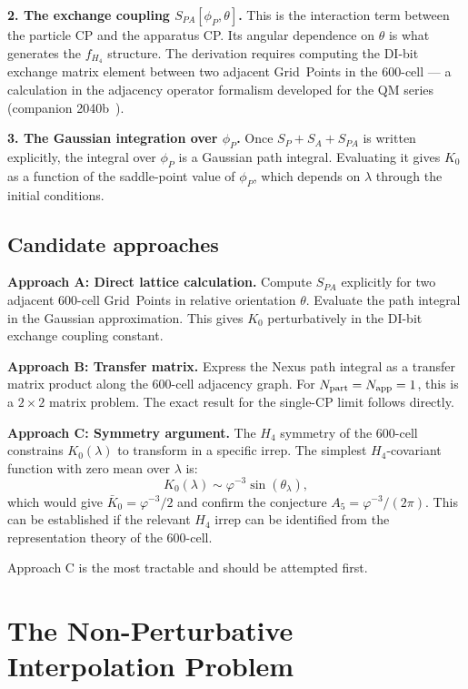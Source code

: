 \documentclass[11pt,letterpaper]{article}
\newcommand{\phig}{\varphi}
\begin{document}
\textbf{2. The exchange coupling $S_{PA}[\phi_P, \theta]$.}
This is the interaction term between the particle CP and the
apparatus CP.  Its angular dependence on $\theta$ is what
generates the $f_{H_4}$ structure.  The derivation requires
computing the DI-bit exchange matrix element between two
adjacent Grid~Points in the 600-cell --- a calculation in
the adjacency operator formalism developed for the QM series
(companion 2040b~\citep{cpp2040b}).

\textbf{3. The Gaussian integration over $\phi_P$.}
Once $S_P + S_A + S_{PA}$ is written explicitly, the integral
over $\phi_P$ is a Gaussian path integral.  Evaluating it
gives $K_0$ as a function of the saddle-point value of
$\phi_P$, which depends on $\lambda$ through the initial
conditions.

\subsection{Candidate approaches}

\textbf{Approach A: Direct lattice calculation.}
Compute $S_{PA}$ explicitly for two adjacent 600-cell Grid~Points
in relative orientation $\theta$.  Evaluate the path integral in
the Gaussian approximation.  This gives $K_0$ perturbatively in
the DI-bit exchange coupling constant.

\textbf{Approach B: Transfer matrix.}
Express the Nexus path integral as a transfer matrix product
along the 600-cell adjacency graph.  For $N_{\rm part} = N_{\rm
app} = 1$, this is a $2 \times 2$ matrix problem.  The exact
result for the single-CP limit follows directly.

\textbf{Approach C: Symmetry argument.}
The $H_4$ symmetry of the 600-cell constrains $K_0(\lambda)$ to
transform in a specific irrep.  The simplest $H_4$-covariant
function with zero mean over $\lambda$ is:
\begin{equation}
K_0(\lambda) \sim \phig^{-3} \sin(\theta_\lambda),
\label{eq:K0_conjecture_form}
\end{equation}
which would give $\bar K_0 = \phig^{-3}/2$ and confirm the
conjecture $A_5 = \phig^{-3}/(2\pi)$.  This can be established
if the relevant $H_4$ irrep can be identified from the
representation theory of the 600-cell.

Approach C is the most tractable and should be attempted first.

\section{The Non-Perturbative Interpolation Problem}
\end{document}
